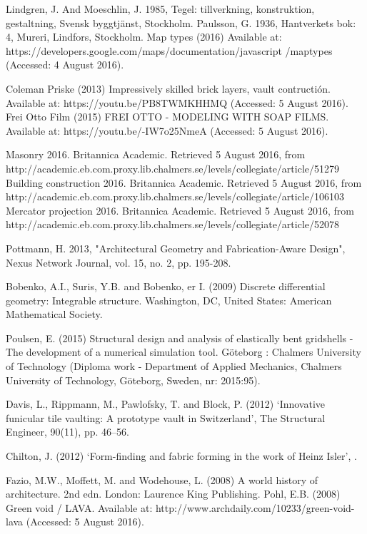 \begin{thebibliography}{69}
Lindgren, J. And Moeschlin, J. 1985, Tegel: tillverkning, konstruktion, gestaltning, Svensk byggtjänst, Stockholm.
 Paulsson, G. 1936, Hantverkets bok: 4, Mureri, Lindfors, Stockholm.
 Map types (2016) Available at: https://developers.google.com/maps/documentation/javascript
/maptypes (Accessed: 4 August 2016).

 Coleman Priske (2013) Impressively skilled brick layers, vault contructión. Available at: https://youtu.be/PB8TWMKHHMQ (Accessed: 5 August 2016).
Frei Otto Film (2015) FREI OTTO - MODELING WITH SOAP FILMS. Available at: https://youtu.be/-IW7o25NmeA (Accessed: 5 August 2016).

Masonry 2016. Britannica Academic. Retrieved 5 August 2016, from http://academic.eb.com.proxy.lib.chalmers.se/levels/collegiate/article/51279
Building construction 2016. Britannica Academic. Retrieved 5 August 2016, from http://academic.eb.com.proxy.lib.chalmers.se/levels/collegiate/article/106103
Mercator projection 2016. Britannica Academic. Retrieved 5 August 2016, from http://academic.eb.com.proxy.lib.chalmers.se/levels/collegiate/article/52078

Pottmann, H. 2013, "Architectural Geometry and Fabrication-Aware Design", Nexus Network Journal, vol. 15, no. 2, pp. 195-208.

Bobenko, A.I., Suris, Y.B. and Bobenko, er I. (2009) Discrete differential geometry: Integrable structure. Washington, DC, United States: American Mathematical Society.


Poulsen, E. (2015) Structural design and analysis of elastically bent gridshells - The development of a numerical simulation tool. Göteborg : Chalmers University of Technology (Diploma work - Department of Applied Mechanics, Chalmers University of Technology, Göteborg, Sweden, nr: 2015:95).



 Davis, L., Rippmann, M., Pawlofsky, T. and Block, P. (2012) ‘Innovative funicular tile vaulting: A prototype vault in Switzerland’, The Structural Engineer, 90(11), pp. 46–56.

Chilton, J. (2012) ‘Form-finding and fabric forming in the work of Heinz Isler’, .


Fazio, M.W., Moffett, M. and Wodehouse, L. (2008) A world history of architecture. 2nd edn. London: Laurence King Publishing.
Pohl, E.B. (2008) Green void / LAVA. Available at: http://www.archdaily.com/10233/green-void-lava (Accessed: 5 August 2016).


\end{thebibliography}
